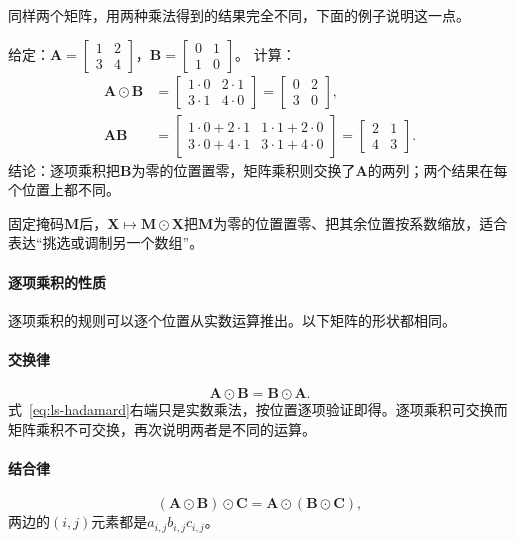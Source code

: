 同样两个矩阵，用两种乘法得到的结果完全不同，下面的例子说明这一点。
\begin{example}[逐项乘积与矩阵乘积的对比]
\label{ex:ls-hadamard-vs-matrix-product}
给定：$\bm A=\left[\begin{smallmatrix}1&2\\3&4\end{smallmatrix}\right]$，$\bm B=\left[\begin{smallmatrix}0&1\\1&0\end{smallmatrix}\right]$。
计算：
\[
 \begin{aligned}
 \bm A\odot\bm B&=\begin{bmatrix}1\cdot0&2\cdot1\\3\cdot1&4\cdot0\end{bmatrix}=\begin{bmatrix}0&2\\3&0\end{bmatrix},\\
 \bm A\bm B&=\begin{bmatrix}1\cdot0+2\cdot1&1\cdot1+2\cdot0\\3\cdot0+4\cdot1&3\cdot1+4\cdot0\end{bmatrix}=\begin{bmatrix}2&1\\4&3\end{bmatrix}.
 \end{aligned}
\]
结论：逐项乘积把$\bm B$为零的位置置零，矩阵乘积则交换了$\bm A$的两列；两个结果在每个位置上都不同。
\end{example}
固定掩码$\bm M$后，$\bm X\mapsto\bm M\odot\bm X$把$\bm M$为零的位置置零、把其余位置按系数缩放，适合表达“挑选或调制另一个数组”。

\paragraph{逐项乘积的性质}

逐项乘积的规则可以逐个位置从实数运算推出。以下矩阵的形状都相同。

\paragraph{交换律}
\[
 \bm A\odot\bm B=\bm B\odot\bm A.
\]
式~\eqref{eq:ls-hadamard}右端只是实数乘法，按位置逐项验证即得。逐项乘积可交换而矩阵乘积不可交换，再次说明两者是不同的运算。

\paragraph{结合律}
\[
 (\bm A\odot\bm B)\odot\bm C=\bm A\odot(\bm B\odot\bm C),
\]
两边的$(i,j)$元素都是$a_{i,j}b_{i,j}c_{i,j}$。


